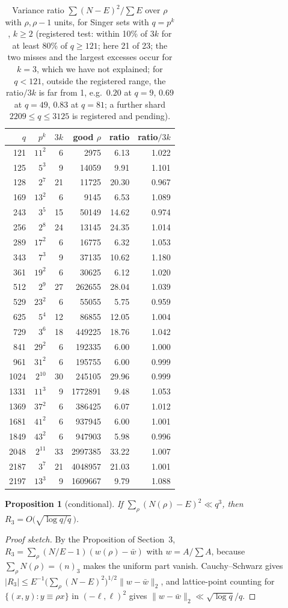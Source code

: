 \documentclass[11pt]{article}
\newtheorem{proposition}{Proposition}
\begin{document}
\begin{table}[h]\centering\small
\begin{tabular}{rrrrrr}\toprule $q$&$p^k$&$3k$&good $\rho$&ratio&ratio$/3k$\\ \midrule
121&$11^{2}$&6&2975&6.13&1.022\\
125&$5^{3}$&9&14059&9.91&1.101\\
128&$2^{7}$&21&11725&20.30&0.967\\
169&$13^{2}$&6&9145&6.53&1.089\\
243&$3^{5}$&15&50149&14.62&0.974\\
256&$2^{8}$&24&13145&24.35&1.014\\
289&$17^{2}$&6&16775&6.32&1.053\\
343&$7^{3}$&9&37135&10.62&1.180\\
361&$19^{2}$&6&30625&6.12&1.020\\
512&$2^{9}$&27&262655&28.04&1.039\\
529&$23^{2}$&6&55055&5.75&0.959\\
625&$5^{4}$&12&86855&12.05&1.004\\
729&$3^{6}$&18&449225&18.76&1.042\\
841&$29^{2}$&6&192335&6.00&1.000\\
961&$31^{2}$&6&195755&6.00&0.999\\
1024&$2^{10}$&30&245105&29.96&0.999\\
1331&$11^{3}$&9&1772891&9.48&1.053\\
1369&$37^{2}$&6&386425&6.07&1.012\\
1681&$41^{2}$&6&937945&6.00&1.001\\
1849&$43^{2}$&6&947903&5.98&0.996\\
2048&$2^{11}$&33&2997385&33.22&1.007\\
2187&$3^{7}$&21&4048957&21.03&1.001\\
2197&$13^{3}$&9&1609667&9.79&1.088\\
\bottomrule\end{tabular}
\caption{Variance ratio $\sum(N-E)^2/\sum E$ over $\rho$ with $\rho,\rho-1$ units, for Singer sets with $q=p^k$, $k\ge2$ (registered test: within 10\% of $3k$ for at least 80\% of $q\ge121$; here 21 of 23; the two misses and the largest excesses occur for $k=3$, which we have not explained; for $q<121$, outside the registered range, the ratio$/3k$ is far from 1, e.g.\ $0.20$ at $q=9$, $0.69$ at $q=49$, $0.83$ at $q=81$; a further shard $2209\le q\le3125$ is registered and pending).}\label{tab:pp}\end{table}
\begin{proposition}[conditional]
If $\sum_\rho(N(\rho)-E)^2\ll q^3$, then $R_3=O\bigl(\sqrt{\log q/q}\,\bigr)$.
\end{proposition}
\begin{proof}[Proof sketch]
By the Proposition of Section~3, $R_3=\sum_\rho(N/E-1)(w(\rho)-\bar w)$ with $w=A/\sum A$, because $\sum_\rho N(\rho)=(n)_3$ makes the
uniform part vanish. Cauchy--Schwarz gives $|R_3|\le E^{-1}\bigl(\sum_\rho(N-E)^2\bigr)^{1/2}\|w-\bar w\|_2$, and lattice-point counting
for $\{(x,y):y\equiv\rho x\}$ in $(-\ell,\ell)^2$ gives $\|w-\bar w\|_2\ll\sqrt{\log q}/q$.
\end{proof}
\end{document}

